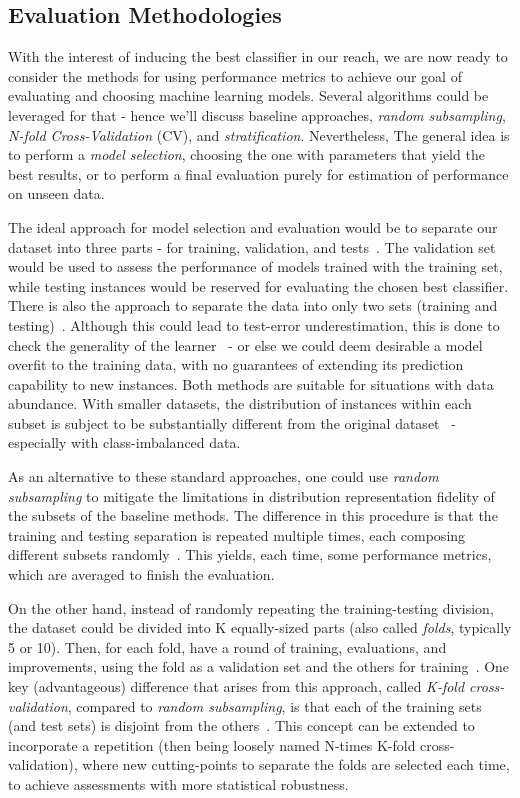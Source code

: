 \subsection{Evaluation Methodologies}\label{subsec:evaluation_methodologies}

With the interest of inducing the best classifier in our reach, we are now ready to consider the methods for using performance metrics to achieve our goal of evaluating and choosing machine learning models.
Several algorithms could be leveraged for that - hence we'll discuss baseline approaches, \textit{random subsampling}, \textit{N-fold Cross-Validation} (CV), and \textit{stratification}.
Nevertheless, The general idea is to perform a \textit{model selection}, choosing the one with parameters that yield the best results, or to perform a final evaluation purely for estimation of performance on unseen data.

The ideal approach for model selection and evaluation would be to separate our dataset into three parts - for training, validation, and tests~\cite{Hastie2009}.
The validation set would be used to assess the performance of models trained with the training set, while testing instances would be reserved for evaluating the chosen best classifier.
There is also the approach to separate the data into only two sets (training and testing)~\cite{Kubat2017}.
Although this could lead to test-error underestimation, this is done to check the generality of the learner~\cite{Hastie2009} - or else we could deem desirable a model overfit to the training data, with no guarantees of extending its prediction capability to new instances.
Both methods are suitable for situations with data abundance.
With smaller datasets, the distribution of instances within each subset is subject to be substantially different from the original dataset~\cite{Kubat2017} - especially with class-imbalanced data.

As an alternative to these standard approaches, one could use \textit{random subsampling} to mitigate the limitations in distribution representation fidelity of the subsets of the baseline methods.
The difference in this procedure is that the training and testing separation is repeated multiple times, each composing different subsets randomly~\cite{Kubat2017}.
This yields, each time, some performance metrics, which are averaged to finish the evaluation.

On the other hand, instead of randomly repeating the training-testing division, the dataset could be divided into K equally-sized parts (also called \textit{folds}, typically 5 or 10).
Then, for each fold, have a round of training, evaluations, and improvements, using the fold as a validation set and the others for training~\cite{Hastie2009}.
One key (advantageous) difference that arises from this approach, called \textit{K-fold cross-validation}, compared to \textit{random subsampling}, is that each of the training sets (and test sets) is disjoint from the others~\cite{Kubat2017}.
This concept can be extended to incorporate a repetition (then being loosely named N-times K-fold cross-validation), where new cutting-points to separate the folds are selected each time, to achieve assessments with more statistical robustness.

